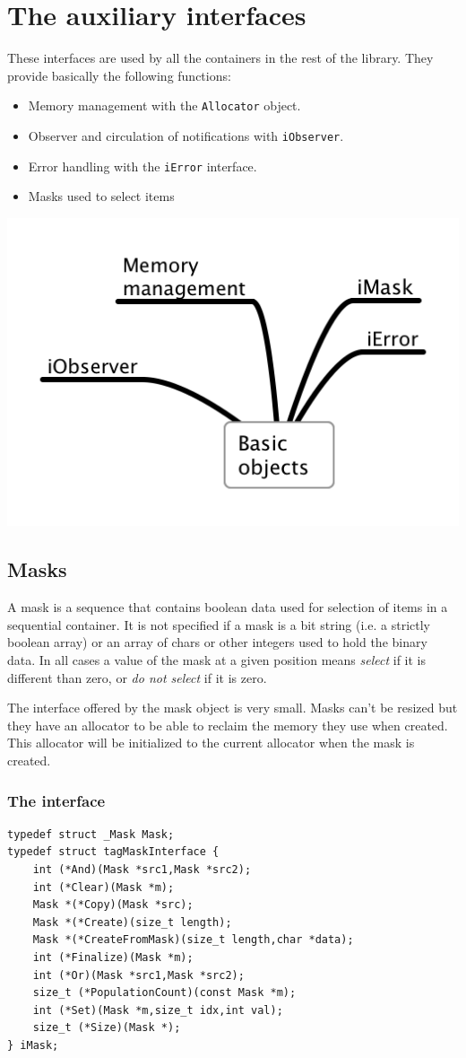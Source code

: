 \documentclass[12pt,a4paper]{memoir} %
\begin{document}
\chapter{The auxiliary interfaces}
These interfaces are used by all the containers in the rest of the library. They provide basically the following functions:
\begin{itemize}
\item Memory management with the \texttt{Allocator} object.
\item Observer and circulation of notifications with \texttt{iObserver}.
\item Error handling with the \texttt{iError} interface.
\item Masks used to select items
\end{itemize}
\includegraphics[scale=0.63]{Basic.png}
\section{Masks}
A mask is a sequence that contains boolean data used for selection of items in a sequential container. 
It is not specified if a mask is a bit string (i.e. a
strictly boolean array) or an array of chars or other integers used to hold the binary data. In all cases a value of the mask at a given position 
means \textsl{select} if it is different than zero, or \textsl{do not select} if it is zero.

The interface offered by the mask object is very small. Masks can't be resized but they have an allocator to be able to reclaim the
memory they use when created. This allocator will be initialized to the current allocator when the mask is created.
\subsection{The interface}
\begin{verbatim}
typedef struct _Mask Mask;
typedef struct tagMaskInterface {
    int (*And)(Mask *src1,Mask *src2);
    int (*Clear)(Mask *m);
    Mask *(*Copy)(Mask *src);
    Mask *(*Create)(size_t length);
    Mask *(*CreateFromMask)(size_t length,char *data);
    int (*Finalize)(Mask *m);
    int (*Or)(Mask *src1,Mask *src2);
    size_t (*PopulationCount)(const Mask *m);
    int (*Set)(Mask *m,size_t idx,int val);
    size_t (*Size)(Mask *);
} iMask;
\end{verbatim}
\end{document}

